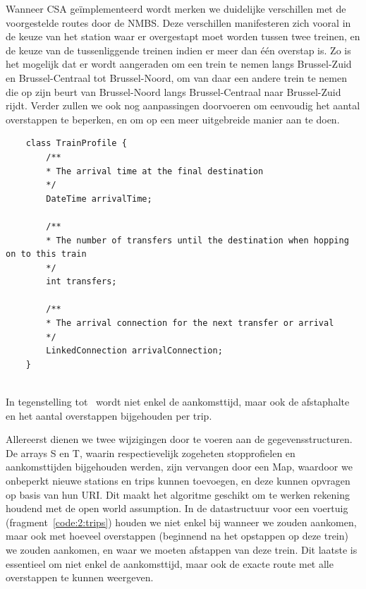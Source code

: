 Wanneer CSA geïmplementeerd wordt merken we duidelijke verschillen met de voorgestelde routes door de NMBS. Deze verschillen manifesteren zich vooral in de keuze van het station waar er overgestapt moet worden tussen twee treinen, en de keuze van de tussenliggende treinen indien er meer dan één overstap is. Zo is het mogelijk dat er wordt aangeraden om een trein te nemen langs Brussel-Zuid en Brussel-Centraal tot Brussel-Noord, om van daar een andere trein te nemen die op zijn beurt van Brussel-Noord langs Brussel-Centraal naar Brussel-Zuid rijdt. 
Verder zullen we ook nog aanpassingen doorvoeren om eenvoudig het aantal overstappen te beperken, en om op een meer uitgebreide manier aan  te doen.

\begin{listing}[htb]
	\begin{verbatim}
	class TrainProfile {
		/**
		* The arrival time at the final destination
		*/
		DateTime arrivalTime;
		
		/**
		* The number of transfers until the destination when hopping on to this train
		*/
		int transfers;
		
		/**
		* The arrival connection for the next transfer or arrival
		*/
		LinkedConnection arrivalConnection;
	}
	
	\end{verbatim}
	\caption[CSA: Gegevensstructuur voor trips]{In tegenstelling tot~\cite{strasser17} wordt niet enkel de aankomsttijd, maar ook de afstaphalte en het aantal overstappen bijgehouden per trip.}
	\label{code:2:trips}
\end{listing}


Allereerst dienen we twee wijzigingen door te voeren aan de gegevensstructuren. De arrays S en T, waarin respectievelijk zogeheten stopprofielen en aankomsttijden bijgehouden werden, zijn vervangen door een Map, waardoor we onbeperkt nieuwe stations en trips kunnen toevoegen, en deze kunnen opvragen op basis van hun URI. Dit maakt het algoritme geschikt om te werken rekening houdend met de open world assumption.  %
In de datastructuur voor een voertuig (fragment~\ref{code:2:trips}) houden we niet enkel bij wanneer we zouden aankomen, maar ook met hoeveel overstappen (beginnend na het opstappen op deze trein) we zouden aankomen, en waar we moeten afstappen van deze trein. Dit laatste is essentieel om niet enkel de aankomsttijd, maar ook de exacte route met alle overstappen te kunnen weergeven. 

